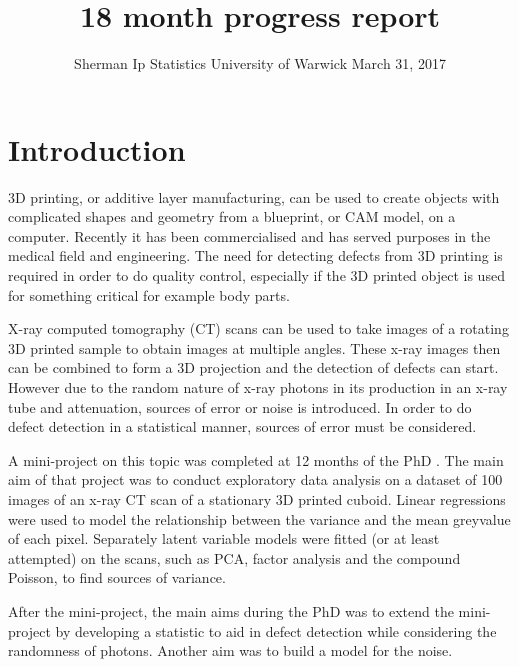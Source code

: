 \documentclass[a4paper]{proc}
\title{18 month progress report}
\author{Sherman Ip \quad Statistics \quad University of Warwick \quad March 31, 2017}
\begin{document}
\maketitle

\begin{abstract}

\end{abstract}

\section{Introduction}
3D printing, or additive layer manufacturing, can be used to create objects with complicated shapes and geometry from a blueprint, or CAM model, on a computer.  Recently it has been commercialised and has served purposes in the medical field and engineering. The need for detecting defects from 3D printing is required in order to do quality control, especially if the 3D printed object is used for something critical for example body parts. 

X-ray computed tomography (CT) scans can be used to take images of a rotating 3D printed sample to obtain images at multiple angles. These x-ray images then can be combined to form a 3D projection and the detection of defects can start. However due to the random nature of x-ray photons in its production in an x-ray tube and attenuation, sources of error or noise is introduced. In order to do defect detection in a statistical manner, sources of error must be considered.

A mini-project on this topic was completed at 12 months of the PhD \cite{ip2016inside}. The main aim of that project was to conduct exploratory data analysis on a dataset of 100 images of an x-ray CT scan of a stationary 3D printed cuboid. Linear regressions were used to model the relationship between the variance and the mean greyvalue of each pixel. Separately latent variable models were fitted (or at least attempted) on the scans, such as PCA, factor analysis and the compound Poisson, to find sources of variance.

After the mini-project, the main aims during the PhD was to extend the mini-project by developing a statistic to aid in defect detection while considering the randomness of photons. Another aim was to build a model for the noise.



\end{document}
